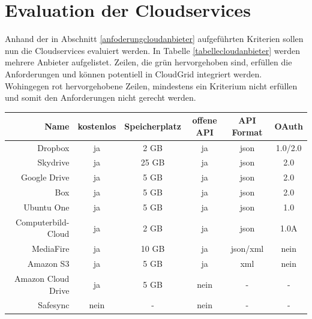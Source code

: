 \section{Evaluation der Cloudservices}
\label{systementwurf-cloudanbieter}
Anhand der in Abschnitt \ref{anfoderungcloudanbieter} aufgeführten Kriterien sollen nun die Cloudservices evaluiert werden.
In Tabelle \ref{tabellecloudanbieter} werden mehrere Anbieter aufgelistet.
Zeilen, die grün hervorgehoben sind, erfüllen die Anforderungen und können potentiell in CloudGrid integriert werden.
Wohingegen rot hervorgehobene Zeilen, mindestens ein Kriterium nicht erfüllen und somit den Anforderungen nicht gerecht werden.

\begin{table}[htpb]
\centering
\begin{tabular}{| r | c c c c c |}
	\rowcolor{dunkelgrau}
	\hline
	Name               & kostenlos & Speicherplatz & offene API & API Format & OAuth    \\
	\hline
	\rowcolor{lightgreen}
	Dropbox            & ja        & 2 GB         & ja          & json        & 1.0/2.0 \\
	\rowcolor{lightgreen}
	Skydrive           & ja        & 25 GB        & ja          & json        & 2.0     \\
	\rowcolor{lightgreen}
	Google Drive       & ja        & 5 GB         & ja          & json        & 2.0     \\
	\rowcolor{lightgreen}
	Box                & ja        & 5 GB         & ja          & json        & 2.0     \\
	\rowcolor{lightgreen}
	Ubuntu One         & ja        & 5 GB         & ja          & json        & 1.0     \\
	\rowcolor{lightgreen}
	Computerbild-Cloud & ja        & 2 GB         & ja          & json        & 1.0A    \\
    \rowcolor{lightred}
    MediaFire          & ja        & 10 GB        & ja          & json/xml    & nein    \\
	\rowcolor{lightred}
	Amazon S3          & ja        & 5 GB         & ja          & xml         & nein    \\
	\rowcolor{lightred}
	Amazon Cloud Drive & ja        & 5 GB         & nein        & -           & -       \\
	\rowcolor{lightred}
	Safesync           & nein      & -            & nein        & -           & -       \\

\end{tabular}
\end{table}
